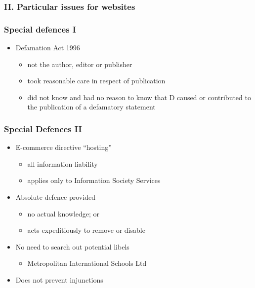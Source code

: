 \documentclass[ignorenonframetext,]{beamer}
\begin{document}
\begin{frame}
\frametitle{II. Particular issues for websites}
\end{frame}

\begin{frame}
\frametitle{Special defences I}

\begin{itemize}
\item  Defamation Act 1996

  \begin{itemize}
  \item    not the author, editor or publisher
  \item    took reasonable care in respect of publication
  \item    did not know and had no reason to know that D caused or
    contributed to the publication of a defamatory statement
  \end{itemize}
\end{itemize}

\end{frame}

\begin{frame}
\frametitle{Special Defences II}

\begin{itemize}
\item  E-commerce directive ``hosting''

  \begin{itemize}
  \item    all information liability
  \item    applies only to Information Society Services
  \end{itemize}
\item  Absolute defence provided

  \begin{itemize}
  \item    no actual knowledge; or
  \item    acts expeditiously to remove or disable
  \end{itemize}
\item  {No need to search out potential libels}

  \begin{itemize}
  \item    {Metropolitan International Schools Ltd}
  \end{itemize}
\item  Does not prevent injunctions
\end{itemize}

~


\end{frame}
\end{document}
